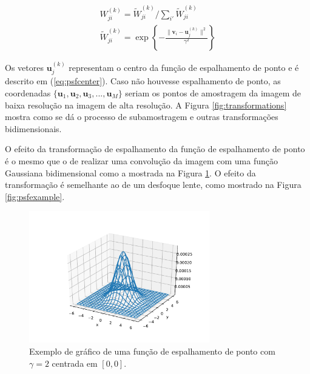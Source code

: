 \documentclass[12pt,openright,oneside,a4paper,english,brazil]{abntex2}
\begin{document}
\begin{gather}
	\label{eq:wmatrix}
	W^{(k)}_{ji} = \widetilde{W}^{(k)}_{ji} / \sum_{i'} \widetilde{W}^{(k)}_{ji} \\
	\label{eq:psf}
	\widetilde{W}^{(k)}_{ji} = \exp \left\{- \frac{\|\mathbf{v}_i - \mathbf{u}^{(k)}_j\|^2}{\gamma^2} \right\}
\end{gather}

Os vetores $\mathbf{u}^{(k)}_j$ representam o centro da função de espalhamento de ponto e é descrito em (\ref{eq:psfcenter}).
Caso não houvesse espalhamento de ponto, as coordenadas $\{\mathbf{u}_1, \mathbf{u}_2,\mathbf{u}_3,..., \mathbf{u}_M\}$ seriam os pontos de amostragem da imagem de baixa resolução na imagem de alta resolução.
A Figura \ref{fig:transformations} mostra como se dá o processo de subamostragem e outras transformações bidimensionais.

O efeito da transformação de espalhamento da função de espalhamento de ponto é o mesmo que o de realizar uma convolução da imagem com uma função Gaussiana bidimensional como a mostrada na Figura \ref{fig:psfplot}.
O efeito da transformação é semelhante ao de um desfoque lente, como mostrado na Figura \ref{fig:psfexample}.


\begin{figure}[h]
	\centering
	\includegraphics[width = 0.7\textwidth]{./figures/psf1.pdf}
	\caption{Exemplo de gráfico de uma função de espalhamento de ponto com $\gamma = 2$ centrada em $[0,0]$.}
	\label{fig:psfplot}
\end{figure}
\end{document}
